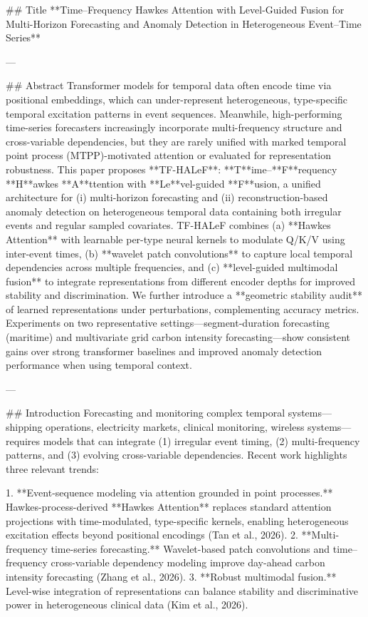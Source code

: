 ## Title  
**Time–Frequency Hawkes Attention with Level-Guided Fusion for Multi-Horizon Forecasting and Anomaly Detection in Heterogeneous Event–Time Series**

---

## Abstract  
Transformer models for temporal data often encode time via positional embeddings, which can under-represent heterogeneous, type-specific temporal excitation patterns in event sequences. Meanwhile, high-performing time-series forecasters increasingly incorporate multi-frequency structure and cross-variable dependencies, but they are rarely unified with marked temporal point process (MTPP)-motivated attention or evaluated for representation robustness. This paper proposes **TF-HALeF**: **T**ime–**F**requency **H**awkes **A**ttention with **Le**vel-guided **F**usion, a unified architecture for (i) multi-horizon forecasting and (ii) reconstruction-based anomaly detection on heterogeneous temporal data containing both irregular events and regular sampled covariates. TF-HALeF combines (a) **Hawkes Attention** with learnable per-type neural kernels to modulate Q/K/V using inter-event times, (b) **wavelet patch convolutions** to capture local temporal dependencies across multiple frequencies, and (c) **level-guided multimodal fusion** to integrate representations from different encoder depths for improved stability and discrimination. We further introduce a **geometric stability audit** of learned representations under perturbations, complementing accuracy metrics. Experiments on two representative settings—segment-duration forecasting (maritime) and multivariate grid carbon intensity forecasting—show consistent gains over strong transformer baselines and improved anomaly detection performance when using temporal context.  

---

## Introduction  
Forecasting and monitoring complex temporal systems—shipping operations, electricity markets, clinical monitoring, wireless systems—requires models that can integrate (1) irregular event timing, (2) multi-frequency patterns, and (3) evolving cross-variable dependencies. Recent work highlights three relevant trends:

1. **Event-sequence modeling via attention grounded in point processes.** Hawkes-process-derived **Hawkes Attention** replaces standard attention projections with time-modulated, type-specific kernels, enabling heterogeneous excitation effects beyond positional encodings (Tan et al., 2026).  
2. **Multi-frequency time-series forecasting.** Wavelet-based patch convolutions and time–frequency cross-variable dependency modeling improve day-ahead carbon intensity forecasting (Zhang et al., 2026).  
3. **Robust multimodal fusion.** Level-wise integration of representations can balance stability and discriminative power in heterogeneous clinical data (Kim et al., 2026).  

